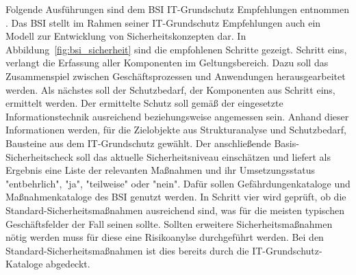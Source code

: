 \documentclass[11pt,a4paper]{report}
\begin{document}
Folgende Ausführungen sind dem BSI IT-Grundschutz Empfehlungen entnommen \cite{bsi_standard1,bsi_standard2,bsi_standard3,bsi_standard4}.
Das BSI stellt im Rahmen seiner IT-Grundschutz Empfehlungen auch ein Modell zur Entwicklung von Sicherheitskonzepten dar. In Abbildung~\ref{fig:bsi_sicherheit} sind die empfohlenen Schritte gezeigt. Schritt eins, verlangt die Erfassung aller Komponenten im Geltungsbereich. Dazu soll das Zusammenspiel zwischen Geschäftsprozessen und Anwendungen herausgearbeitet werden. Als nächstes soll der Schutzbedarf, der Komponenten aus Schritt eins, ermittelt werden. Der ermittelte Schutz soll gemäß der eingesetzte Informationstechnik ausreichend beziehungsweise angemessen sein. Anhand dieser Informationen werden, für die Zielobjekte aus Strukturanalyse und Schutzbedarf, Bausteine aus dem IT-Grundschutz gewählt. Der anschließende Basis-Sicherheitscheck soll das aktuelle Sicherheitsniveau einschätzen und liefert als Ergebnis eine Liste der relevanten Maßnahmen und ihr Umsetzungsstatus "entbehrlich", "ja", "teilweise" oder "nein". Dafür sollen Gefährdungenkataloge und Maßnahmenkataloge des BSI genutzt werden. In Schritt vier wird geprüft, ob die Standard-Sicherheitsmaßnahmen ausreichend sind, was für die meisten typischen Geschäftsfelder der Fall seinen sollte. Sollten erweitere Sicherheitsmaßnahmen nötig werden muss für diese eine Risikoanylse durchgeführt werden. Bei den Standard-Sicherheitsmaßnahmen ist dies bereits durch die IT-Grundschutz-Kataloge abgedeckt. 
\end{document}
